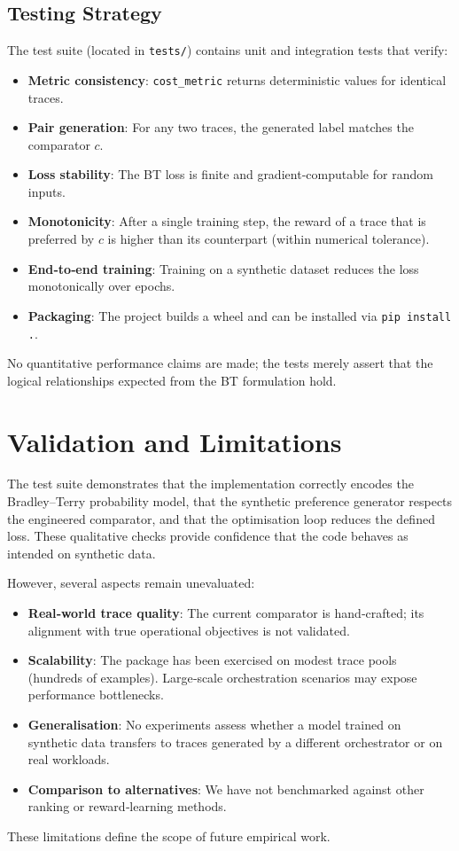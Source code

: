 \documentclass[11pt,a4paper]{article}
\begin{document}
\subsection{Testing Strategy}
The test suite (located in \texttt{tests/}) contains unit and integration tests that verify:
\begin{itemize}
    \item \textbf{Metric consistency}: \texttt{cost\_metric} returns deterministic values for identical traces.
    \item \textbf{Pair generation}: For any two traces, the generated label matches the comparator $c$.
    \item \textbf{Loss stability}: The BT loss is finite and gradient‑computable for random inputs.
    \item \textbf{Monotonicity}: After a single training step, the reward of a trace that is preferred by $c$ is higher than its counterpart (within numerical tolerance).
    \item \textbf{End‑to‑end training}: Training on a synthetic dataset reduces the loss monotonically over epochs.
    \item \textbf{Packaging}: The project builds a wheel and can be installed via \texttt{pip install .}.
\end{itemize}
No quantitative performance claims are made; the tests merely assert that the logical relationships expected from the BT formulation hold.

\section{Validation and Limitations}
The test suite demonstrates that the implementation correctly encodes the Bradley–Terry probability model, that the synthetic preference generator respects the engineered comparator, and that the optimisation loop reduces the defined loss.  These qualitative checks provide confidence that the code behaves as intended on synthetic data.

However, several aspects remain unevaluated:
\begin{itemize}
    \item \textbf{Real‑world trace quality}: The current comparator is hand‑crafted; its alignment with true operational objectives is not validated.
    \item \textbf{Scalability}: The package has been exercised on modest trace pools (hundreds of examples).  Large‑scale orchestration scenarios may expose performance bottlenecks.
    \item \textbf{Generalisation}: No experiments assess whether a model trained on synthetic data transfers to traces generated by a different orchestrator or on real workloads.
    \item \textbf{Comparison to alternatives}: We have not benchmarked against other ranking or reward‑learning methods.
\end{itemize}
These limitations define the scope of future empirical work.
\end{document}
